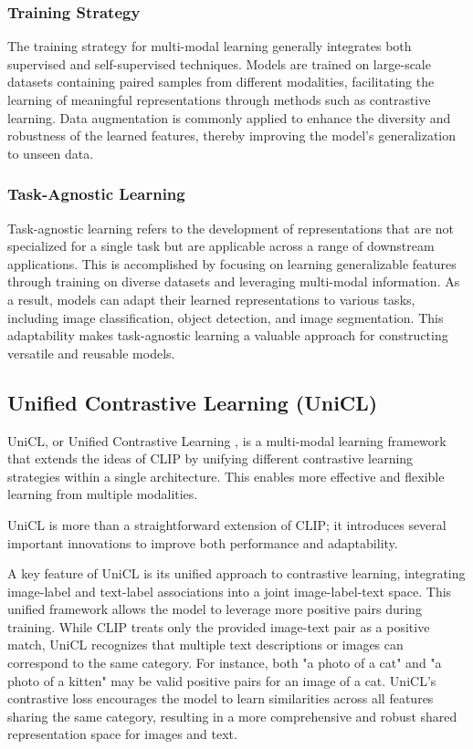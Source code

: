\subsubsection{Training Strategy}
\label{subsec:training_strategy}
The training strategy for multi-modal learning generally integrates both supervised and self-supervised techniques. Models are trained on large-scale datasets containing paired samples from different modalities, facilitating the learning of meaningful representations through methods such as contrastive learning. Data augmentation is commonly applied to enhance the diversity and robustness of the learned features, thereby improving the model's generalization to unseen data.

\subsubsection{Task-Agnostic Learning}
\label{subsec:task_agnostic_learning}
Task-agnostic learning refers to the development of representations that are not specialized for a single task but are applicable across a range of downstream applications. This is accomplished by focusing on learning generalizable features through training on diverse datasets and leveraging multi-modal information. As a result, models can adapt their learned representations to various tasks, including image classification, object detection, and image segmentation. This adaptability makes task-agnostic learning a valuable approach for constructing versatile and reusable models.

\subsection{Unified Contrastive Learning (UniCL)}
\label{subsec:unicl}

UniCL, or Unified Contrastive Learning \cite{vl_unicl}, is a multi-modal learning framework that extends the ideas of CLIP by unifying different contrastive learning strategies within a single architecture. This enables more effective and flexible learning from multiple modalities.

UniCL \cite{vl_unicl} is more than a straightforward extension of CLIP; it introduces several important innovations to improve both performance and adaptability.

A key feature of UniCL is its unified approach to contrastive learning, integrating image-label and text-label associations into a joint image-label-text space. This unified framework allows the model to leverage more positive pairs during training. While CLIP treats only the provided image-text pair as a positive match, UniCL recognizes that multiple text descriptions or images can correspond to the same category. For instance, both "a photo of a cat" and "a photo of a kitten" may be valid positive pairs for an image of a cat. UniCL's contrastive loss encourages the model to learn similarities across all features sharing the same category, resulting in a more comprehensive and robust shared representation space for images and text.

